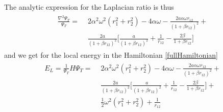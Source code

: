 \documentclass[english, a4paper]{article}
\begin{document}
The analytic expression for the Laplacian ratio is thus
\begin{align}
\begin{split}
 \frac{\nabla^2\Psi_T}{\Psi_T} =  \,\, &2\alpha^2 \omega^2(r_1^2 + r_2^2) - 4\alpha \omega
 - \frac{2a\alpha \omega r_{12}}{(1+\beta r_{12})^2} + \\
 &\frac{2a}{(1+\beta r_{12})^2}\biggr[ \frac{a}{(1+\beta r_{12})^2} + 
              \frac{1}{r_{12}} - \frac{2\beta}{1 + \beta r_{12}} \biggr]
              \label{analyticLocalEnergy}
\end{split}
\end{align}
and we get for the local energy in the Hamiltonian \eqref{fullHamiltonian}
\begin{align}
\begin{split}
 E_L = \frac{1}{\Psi_T}H\Psi_T = \,\,  &2\alpha^2 \omega^2(r_1^2 + r_2^2) - 4\alpha \omega
 - \frac{2a\alpha \omega r_{12}}{(1+\beta r_{12})^2} + \\
 &\frac{2a}{(1+\beta r_{12})^2}\biggr[ \frac{a}{(1+\beta r_{12})^2} + 
              \frac{1}{r_{12}} - \frac{2\beta}{1 + \beta r_{12}} \biggr] + \\
 &\frac{1}{2}\omega^2(r_1^2 + r_2^2) + \frac{1}{r_{12}}
\end{split}
\end{align}
\end{document}
